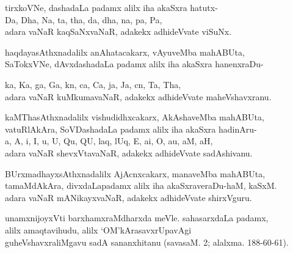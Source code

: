 \begin{entry}
\begin{shl}
tirxkoVNe, dashadaLa padamx alilx iha akaSxra hatutx-\\
Da, Dha, Na, ta, tha, da, dha, na, pa, Pa,\\
adara vaNaR kaqSaNxvaNaR, adakekx adhideVvate viSuNx.
\end{shl}
\smallskip
\begin{shl}
haqdayasAthxnadalilx anAhatacakarx, vAyuveMba mahABUta,\\
SaTokxVNe, dAvxdashadaLa padamx alilx iha akaSxra hanenxraDu-
\end{shl}
\smallskip
\begin{shl}
ka, Ka, ga, Ga, kn, ca, Ca, ja, Ja, cn, Ta, Tha,\\
adara vaNaR kuMkumavaNaR, adakekx adhideVvate maheVshavxranu.
\end{shl}
\smallskip
\begin{shl}
kaMThasAthxnadalilx vishudidhxcakarx, AkAshaveMba mahABUta, \\
vatuRlAkAra, SoVDashadaLa padamx alilx iha akaSxra hadinAru-\\
a, A, i, I, u, U, Qu, QU, laq, lUq, E, ai, O, au, aM, aH,\\
adara vaNaR shevxVtavaNaR, adakekx adhideVvate sadAshivanu.
\end{shl}
\smallskip
\begin{shl}
BUrxmadhayxsAthxnadalilx AjAcnxcakarx, manaveMba mahABUta, \\
tamaMdAkAra, divxdaLapadamx alilx iha akaSxraveraDu-haM, kaSxM.\\
adara vaNaR mANikayxvaNaR, adakekx adhideVvate shirxVguru.
\end{shl}
\smallskip
\begin{shl}
unamxnijoyxVti barxhamxraMdharxda meVle. sahasarxdaLa padamx,\\
alilx amaqtavihudu, alilx `OM'kArasavxrUpavAgi\\
guheVshavxraliMgavu sadA sananxhitanu (savasaM. 2; alalxma. 188-60-61).
\end{shl}
\end{entry}


